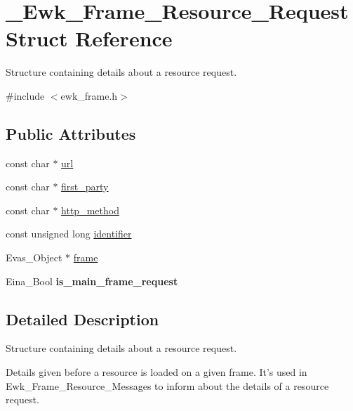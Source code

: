\hypertarget{struct__Ewk__Frame__Resource__Request}{\section{\+\_\+\+Ewk\+\_\+\+Frame\+\_\+\+Resource\+\_\+\+Request Struct Reference}
\label{struct__Ewk__Frame__Resource__Request}
}


Structure containing details about a resource request.  




{\ttfamily \#include $<$ewk\+\_\+frame.\+h$>$}

\subsection*{Public Attributes}
\begin{DoxyCompactItemize}
\item 
const char $\ast$ \hyperlink{struct__Ewk__Frame__Resource__Request_a88c8c0c0bc8dc3b052792a6d9d3cd074}{url}
\item 
const char $\ast$ \hyperlink{struct__Ewk__Frame__Resource__Request_aadd34ea642faad2fe02b490fc99685fa}{first\+\_\+party}
\item 
const char $\ast$ \hyperlink{struct__Ewk__Frame__Resource__Request_aa8fe1c1fa66619f6d779a34d83a93697}{http\+\_\+method}
\item 
const unsigned long \hyperlink{struct__Ewk__Frame__Resource__Request_a051c396f71ccbf8955aebc219c98375c}{identifier}
\item 
Evas\+\_\+\+Object $\ast$ \hyperlink{struct__Ewk__Frame__Resource__Request_a92ed91ff7edf6730f0328830d335b7cb}{frame}
\item 
\hypertarget{struct__Ewk__Frame__Resource__Request_a0e47d3f56816130a2dd64e140903abcc}{Eina\+\_\+\+Bool {\bfseries is\+\_\+main\+\_\+frame\+\_\+request}}\label{struct__Ewk__Frame__Resource__Request_a0e47d3f56816130a2dd64e140903abcc}

\end{DoxyCompactItemize}


\subsection{Detailed Description}
Structure containing details about a resource request. 

Details given before a resource is loaded on a given frame. It's used in Ewk\+\_\+\+Frame\+\_\+\+Resource\+\_\+\+Messages to inform about the details of a resource request. 

